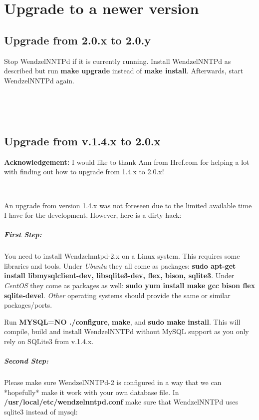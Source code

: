 \chapter{Upgrade to a newer version}\label{Ch:Upgrade}

\section{Upgrade from 2.0.x to 2.0.y}

Stop WendzelNNTPd if it is currently running. Install WendzelNNTPd as described but run {\bf make upgrade} instead of {\bf make install}. Afterwards, start WendzelNNTPd again.

~

~

\section{Upgrade from v.1.4.x to 2.0.x}

{\bf Acknowledgement:} I would like to thank Ann from Href.com for helping a lot with finding out how to upgrade from 1.4.x to 2.0.x!

~

An upgrade from version 1.4.x was not foreseen due to the limited available time I have for the development. However, here is a dirty hack:

\paragraph*{First Step:} You need to install Wendzelnntpd-2.x on a Linux system. This requires some libraries and tools.
Under {\it Ubuntu} they all come as packages: {\bf sudo apt-get install libmysqlclient-dev, libsqlite3-dev, flex, bison, sqlite3}. Under {\it CentOS} they come as packages as well: {\bf sudo yum install make gcc bison flex sqlite-devel}. {\it Other} operating systems should provide the same or similar packages/ports.

Run {\bf MYSQL=NO ./configure}, {\bf make}, and {\bf sudo make install}. This will compile, build and install WendzelNNTPd without MySQL support as you only rely on SQLite3 from v.1.4.x.

\paragraph*{Second Step:} Please make sure WendzelNNTPd-2 is configured in a way that we can *hopefully* make it work with your own database file. In {\bf /usr/local/etc/wendzelnntpd.conf} make sure that WendzelNNTPd uses sqlite3 instead of mysql:

